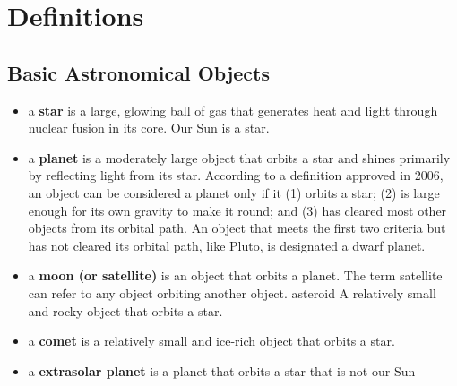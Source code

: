 \documentclass[12pt]{article}
\begin{document}
\section{Definitions}
\subsection{Basic Astronomical Objects}
\begin{itemize}
\item a {\bf star} is a large, glowing ball of gas that generates heat and light through nuclear fusion in its core. Our Sun is a star.
\item a {\bf planet} is a moderately large object that orbits a star and shines primarily by reflecting light from its star. According to a definition
approved in 2006, an object can be considered a planet only if it (1) orbits a star; (2) is large enough for its own gravity to make
it round; and (3) has cleared most other objects from its orbital path. An object that meets the first two criteria but has not
cleared its orbital path, like Pluto, is designated a dwarf planet.
\item a {\bf moon (or satellite)} is an object that orbits a planet. The term satellite can refer to any object orbiting another object.
asteroid A relatively small and rocky object that orbits a star.
\item a {\bf comet} is a relatively small and ice-rich object that orbits a star.
\item a {\bf extrasolar planet} is a planet that orbits a star that is not our Sun
\end{itemize}
\end{document}
